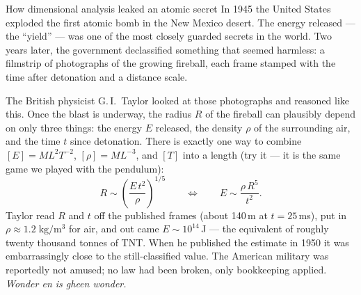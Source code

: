 \begin{supplementary}{How dimensional analysis leaked an atomic secret}
In 1945 the United States exploded the first atomic bomb in the New Mexico
desert. The energy released --- the ``yield'' --- was one of the most closely
guarded secrets in the world. Two years later, the government declassified
something that seemed harmless: a filmstrip of photographs of the growing
fireball, each frame stamped with the time after detonation and a distance
scale.

The British physicist G.\,I.\ Taylor looked at those photographs and reasoned
like this. Once the blast is underway, the radius $R$ of the fireball can
plausibly depend on only three things: the energy $E$ released, the density
$\rho$ of the surrounding air, and the time $t$ since detonation. There is
exactly one way to combine $[E]=ML^2T^{-2}$, $[\rho]=ML^{-3}$, and $[T]$ into
a length (try it --- it is the same game we played with the pendulum):
\[
  R \sim \left(\frac{E\,t^2}{\rho}\right)^{\!1/5}
  \qquad\Longleftrightarrow\qquad
  E \sim \frac{\rho\,R^5}{t^2}.
\]
Taylor read $R$ and $t$ off the published frames (about 140\,m at
$t=25$\,ms), put in $\rho\approx1.2\;\mathrm{kg/m^3}$ for air, and out came
$E\sim10^{14}$\,J --- the equivalent of roughly twenty thousand tonnes of TNT.
When he published the estimate in 1950 it was embarrassingly close to the
still-classified value. The American military was reportedly not amused; no
law had been broken, only bookkeeping applied. \emph{Wonder en is gheen
wonder.}
\end{supplementary}
